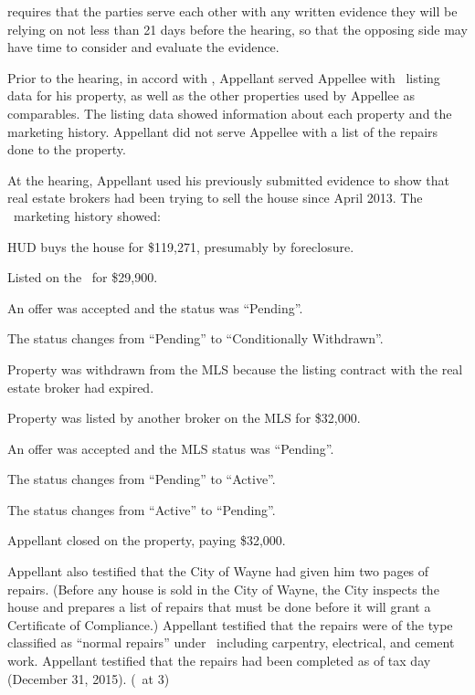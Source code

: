 \documentclass[12pt,\documentclassflag]{michiganCourtOfAppealsBrief}
\def\mathieuGast{\pincite[l]{MCL}{211.27(2)}}
\def\ttr287{\pincite[s]{TTR}{287}}
\begin{document}
\ttr287 requires that the parties serve each other with any written evidence they will be relying on not less than 21 days before the hearing, so that the opposing side may have time to consider and evaluate the evidence.

Prior to the hearing, in accord with \ttr287, Appellant served Appellee with \MLS\ listing data for his property, as well as the other properties used by Appellee as comparables. The listing data showed information about each property and the marketing history. Appellant did not serve Appellee with a list of the repairs done to the property.

At the hearing, Appellant used his previously submitted evidence to show that real estate brokers had been trying to sell the house since April 2013. The \MLS\ marketing history showed: 

\begin{description}[style=multiline,leftmargin=3cm,font=\normalfont,itemsep=.5\baselineskip,align=right]
  \singlespacing 
\item[3/16/2005] HUD buys the house for \$119,271, presumably by foreclosure. 
\item[4/3/2013] Listed on the \MLS\ for \$29,900. 
\item[5/3/2013] An offer was accepted and the status was ``Pending''.
\item[10/23/2013] The status changes from ``Pending'' to ``Conditionally Withdrawn''. 
\item[10/24/2013] Property was withdrawn from the MLS because the listing contract with the real estate broker had expired. 
\item[6/17/2015] Property was listed by another broker on the MLS for \$32,000. 
\item[6/29/2015] An offer was accepted and the MLS status was ``Pending''. 
\item[7/3/2015] The status changes from ``Pending'' to ``Active''.
\item[7/6/2015] The status changes from ``Active''  to ``Pending''.
\item[8/19/2015] Appellant closed on the property, paying \$32,000. 
\end{description}

Appellant also testified that the City of Wayne had given him two pages of repairs. (Before any house is sold in the City of Wayne, the City inspects the house and prepares a list of repairs that must be done before it will grant a Certificate of Compliance.) Appellant testified that the repairs were of the type classified as ``normal repairs'' under \mathieuGast\ including carpentry, electrical, and cement work. Appellant testified that the repairs had been completed as of tax day (December 31, 2015). (\POJ\ at 3)
\end{document}
